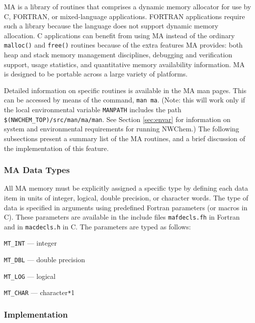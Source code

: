 \label{sec:ma}

MA is a library of routines that comprises a dynamic memory allocator
for use by C, FORTRAN, or mixed-language applications.  FORTRAN
applications require such a library because the language does not
support dynamic memory allocation.  C applications can benefit from
using MA instead of the ordinary {\tt malloc()} and {\tt free()}
routines because of the extra features MA provides: both heap and
stack memory management disciplines, debugging and verification
support, usage statistics, and quantitative memory availability
information.  MA is designed to be portable across a large variety of
platforms.

Detailed information on specific routines is available in the MA man pages.
This can be accessed by means of the command, {\tt man ma}.  (Note: this 
will work only if the local environmental variable {\tt MANPATH} includes
the path {\tt \$(NWCHEM\_TOP)/src/man/ma/man}.  See Section \ref{sec:envar}
for information on system and environmental requirements for running NWChem.)
The following subsections present a summary list of the MA routines, and 
a brief discussion of the implementation of this feature.

\subsubsection{MA Data Types}

All MA memory must be explicitly assigned a specific type by defining each
data item in units of integer, logical, 
double precision, or character words.  The type of data is specified
in arguments using predefined Fortran parameters (or macros in C).
These parameters are available in the include files \verb+mafdecls.fh+ in 
Fortran and in \verb+macdecls.h+ in C.  The parameters are typed as follows:

\begin{description} 
\item{\verb+MT_INT+} --- integer
\item{\verb+MT_DBL+} --- double precision
\item{\verb+MT_LOG+} --- logical
\item{\verb+MT_CHAR+} --- character\verb+*+1
\end{description}

\subsubsection{Implementation}

